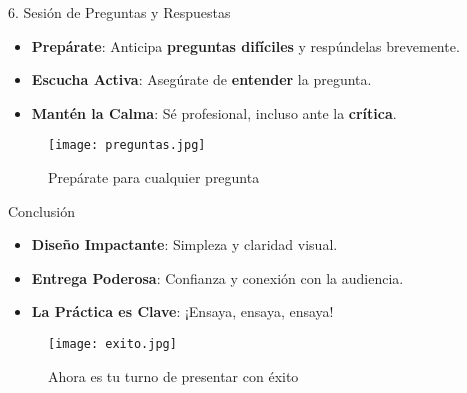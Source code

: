 \documentclass{beamer}
\begin{document}
\begin{frame}{6. Sesión de Preguntas y Respuestas}
    \begin{itemize}
        \item \textbf{Prepárate}: Anticipa \textbf{preguntas difíciles} y respúndelas brevemente.
        \item \textbf{Escucha Activa}: Asegúrate de \textbf{entender} la pregunta.
        \item \textbf{Mantén la Calma}: Sé profesional, incluso ante la \textbf{crítica}.
    \end{itemize}
    
    \vspace{0.5cm}
    \begin{figure}
        \centering
        \texttt{[image: preguntas.jpg]}
        \caption{Prepárate para cualquier pregunta}
    \end{figure}
\end{frame}

\begin{frame}{Conclusión}
    \begin{itemize}
        \item \textbf{Diseño Impactante}: Simpleza y claridad visual.
        \item \textbf{Entrega Poderosa}: Confianza y conexión con la audiencia.
        \item \textbf{La Práctica es Clave}: ¡Ensaya, ensaya, ensaya!
    \end{itemize}
    
    \vspace{0.5cm}
    \begin{figure}
        \centering
        \texttt{[image: exito.jpg]}
        \caption{Ahora es tu turno de presentar con éxito}
    \end{figure}
\end{frame}
\end{document}
